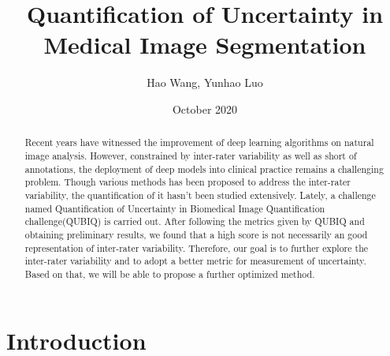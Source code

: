 \documentclass[12pt]{extarticle}
\title{Quantification of Uncertainty in Medical Image Segmentation}
\author{Hao Wang, Yunhao Luo}
\date{October 2020}
\begin{document}
\maketitle
\begin{abstract}
Recent years have witnessed the improvement of deep learning algorithms on natural image 
analysis. However, constrained by inter-rater variability as well as short of annotations, 
the deployment of deep models into clinical practice remains a challenging problem. Though various methods
has been proposed to address the inter-rater variability, the quantification of it hasn't been 
studied extensively. Lately, a challenge named Quantification of Uncertainty in Biomedical Image Quantification challenge(QUBIQ)
is carried out. After following the metrics given by QUBIQ and obtaining preliminary results, we found that a high score 
is not necessarily an good representation of inter-rater variability. Therefore, our goal is to 
further explore the inter-rater variability and to adopt a better metric for measurement of uncertainty. 
Based on that, we will be able to propose a further optimized method. 
\end{abstract}
\section{Introduction}
\end{document}
